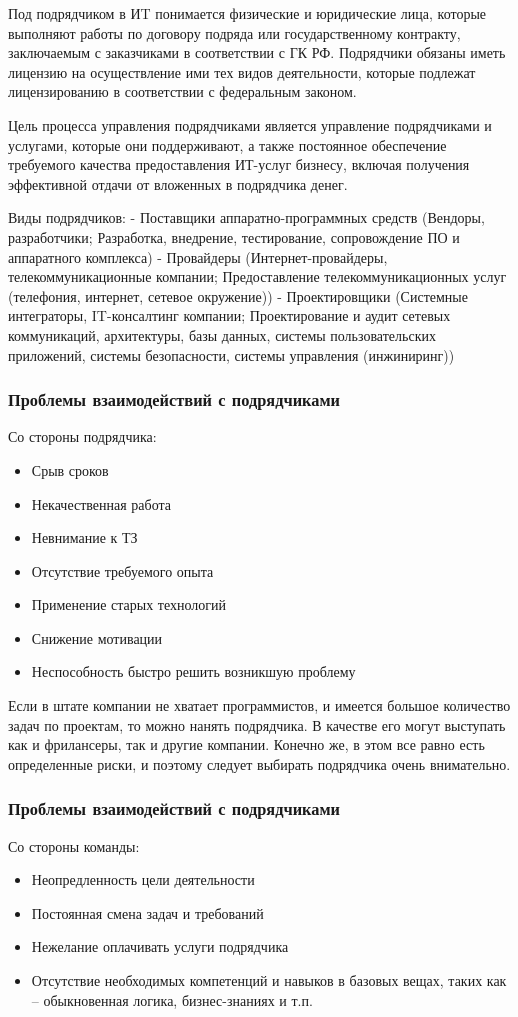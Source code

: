 \documentclass{../industrial-development}
\begin{document}
\lecturenotes
Под подрядчиком в ИT понимается физические и юридические лица, которые выполняют работы по договору подряда или государственному контракту, заключаемым с заказчиками в соответствии с ГК РФ. Подрядчики обязаны иметь лицензию на осуществление ими тех видов деятельности, которые подлежат лицензированию в соответствии с федеральным законом.

Цель процесса управления подрядчиками является управление подрядчиками и услугами, которые они поддерживают, а также постоянное обеспечение требуемого качества предоставления ИТ-услуг бизнесу, включая получения эффективной отдачи от вложенных в подрядчика денег.

Виды подрядчиков:
- Поставщики аппаратно-программных средств (Вендоры, разработчики; Разработка, внедрение, тестирование, сопровождение ПО и аппаратного комплекса)
- Провайдеры (Интернет-провайдеры, телекоммуникационные компании; Предоставление телекоммуникационных услуг (телефония, интернет, сетевое окружение))
- Проектировщики (Системные интеграторы, IT-консалтинг компании; Проектирование и аудит сетевых коммуникаций, архитектуры, базы данных, системы пользовательских приложений, системы безопасности, системы управления (инжиниринг))

\begin{frame} \frametitle{Проблемы взаимодействий с подрядчиками}
	Со стороны подрядчика:
	\begin{itemize}
		\item Срыв сроков 
		\item Некачественная работа
		\item Невнимание к ТЗ
		\item Отсутствие требуемого опыта
		\item Применение старых технологий
		\item Снижение мотивации
		\item Неспособность быстро решить возникшую проблему
  	\end{itemize}
\end{frame}

\lecturenotes
Если в штате компании не хватает программистов, и имеется большое количество задач по проектам, то можно нанять подрядчика. В качестве его могут выступать как и фрилансеры, так и другие компании. Конечно же, в этом все равно есть определенные риски, и поэтому следует выбирать подрядчика очень внимательно. 

\begin{frame} \frametitle{Проблемы взаимодействий с подрядчиками}
	Со стороны команды:
	\begin{itemize}
		\item Неопредленность цели деятельности
		\item Постоянная смена задач и требований
		\item Нежелание оплачивать услуги подрядчика
		\item Отсутствие необходимых компетенций и навыков  в базовых вещах, таких как – обыкновенная логика, бизнес-знаниях и т.п.
	\end{itemize}
\end{frame}
\end{document}
